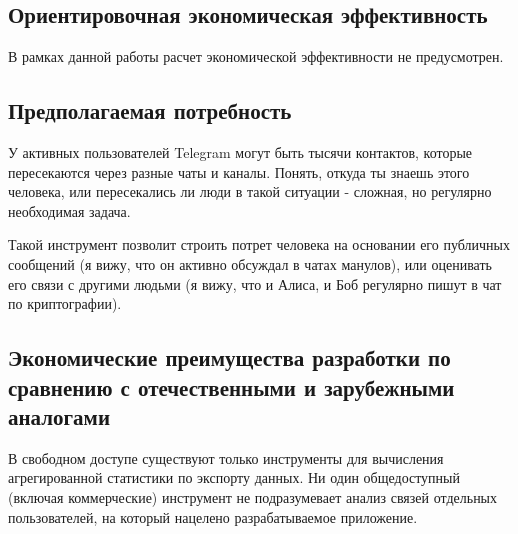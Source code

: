 \subsection{Ориентировочная экономическая эффективность}

В рамках данной работы расчет экономической эффективности не предусмотрен.

\subsection{Предполагаемая потребность}

У активных пользователей Telegram могут быть тысячи контактов, которые пересекаются через разные чаты и каналы. Понять, откуда ты знаешь этого человека, или пересекались ли люди в такой ситуации - сложная, но регулярно необходимая задача.

Такой инструмент позволит строить потрет человека на основании его публичных сообщений (я вижу, что он активно обсуждал в чатах манулов), или оценивать его связи с другими людьми (я вижу, что и Алиса, и Боб регулярно пишут в чат по криптографии).

\subsection{Экономические преимущества разработки по сравнению с отечественными и зарубежными аналогами}

В свободном доступе существуют только инструменты для вычисления агрегированной статистики по экспорту данных. Ни один общедоступный (включая коммерческие) инструмент не подразумевает анализ связей отдельных пользователей, на который нацелено разрабатываемое приложение.